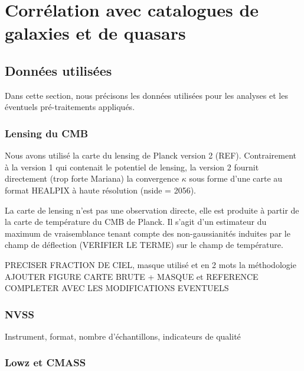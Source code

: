 
\chapter{Corrélation avec catalogues de galaxies et de quasars} %

\label{Chapter6} %



\section{Données utilisées}

Dans cette section, nous précisons les données utilisées pour les analyses et les éventuels pré-traitements appliqués.

\subsection{Lensing du CMB}

Nous avons utilisé la carte du lensing de Planck version 2 (REF). Contrairement à la version 1 qui contenait le potentiel de lensing, la version 2 fournit directement (trop forte Mariana) la convergence $\kappa$ sous forme d'une carte au format HEALPIX à haute résolution (nside = 2056).

La carte de lensing n'est pas une observation directe, elle est produite à partir de la carte de température du CMB de Planck. Il s'agit d'un estimateur du maximum de vraisemblance tenant compte des non-gaussianités induites par le champ de déflection (VERIFIER LE TERME) sur le champ de température.


PRECISER FRACTION DE CIEL, masque utilisé et en 2 mots la méthodologie
AJOUTER FIGURE CARTE BRUTE + MASQUE et REFERENCE
COMPLETER AVEC LES MODIFICATIONS EVENTUELS

\subsection{NVSS}
Instrument, format, nombre d'échantillons, indicateurs de qualité

\subsection{Lowz et CMASS}
